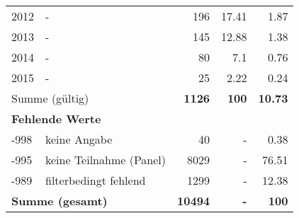 \begin{longtable}{lXrrr}
     2012 &
     \multicolumn{1}{X}{ -  } &


       \num{196} &
       \num[round-mode=places,round-precision=2]{17,41} &
         \num[round-mode=places,round-precision=2]{1,87} \\

     2013 &
     \multicolumn{1}{X}{ -  } &


       \num{145} &
       \num[round-mode=places,round-precision=2]{12,88} &
         \num[round-mode=places,round-precision=2]{1,38} \\

     2014 &
     \multicolumn{1}{X}{ -  } &


       \num{80} &
       \num[round-mode=places,round-precision=2]{7,1} &
         \num[round-mode=places,round-precision=2]{0,76} \\

     2015 &
     \multicolumn{1}{X}{ -  } &


       \num{25} &
       \num[round-mode=places,round-precision=2]{2,22} &
         \num[round-mode=places,round-precision=2]{0,24} \\
     \midrule
     \multicolumn{2}{l}{Summe (gültig)} &
       \textbf{\num{1126}} &
     \textbf{100} &
       \textbf{\num[round-mode=places,round-precision=2]{10,73}} \\
     \multicolumn{5}{l}{\textbf{Fehlende Werte}}\\
       -998 &
       keine Angabe &
         \num{40} &
        - &
         \num[round-mode=places,round-precision=2]{0,38} \\
       -995 &
       keine Teilnahme (Panel) &
         \num{8029} &
        - &
         \num[round-mode=places,round-precision=2]{76,51} \\
       -989 &
       filterbedingt fehlend &
         \num{1299} &
        - &
         \num[round-mode=places,round-precision=2]{12,38} \\
     \midrule
     \multicolumn{2}{l}{\textbf{Summe (gesamt)}} &
          \textbf{\num{10494}} &
        \textbf{-} &
        \textbf{100} \\
     \bottomrule
     \end{longtable}
     
